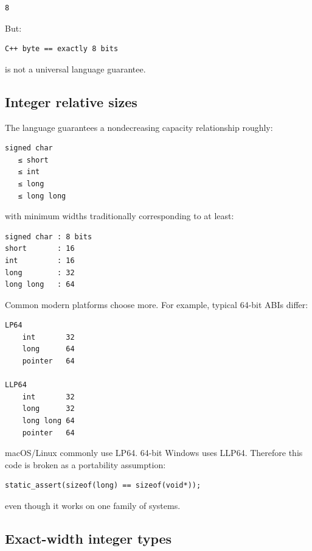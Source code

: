 \begin{verbatim}
8
\end{verbatim}

But:

\begin{verbatim}
C++ byte == exactly 8 bits
\end{verbatim}

is not a universal language guarantee.

\subsection{Integer relative sizes}\label{01-foundations-i-ch002-integer-relative-sizes}

The language guarantees a nondecreasing capacity relationship roughly:

\begin{verbatim}
signed char
   ≤ short
   ≤ int
   ≤ long
   ≤ long long
\end{verbatim}

with minimum widths traditionally corresponding to at least:

\begin{verbatim}
signed char : 8 bits
short       : 16
int         : 16
long        : 32
long long   : 64
\end{verbatim}

Common modern platforms choose more. For example, typical 64-bit ABIs differ:

\begin{verbatim}
LP64
    int       32
    long      64
    pointer   64

LLP64
    int       32
    long      32
    long long 64
    pointer   64
\end{verbatim}

macOS/Linux commonly use LP64. 64-bit Windows uses LLP64. Therefore this code is broken as a portability assumption:

\begin{verbatim}
static_assert(sizeof(long) == sizeof(void*));
\end{verbatim}

even though it works on one family of systems.

\subsection{Exact-width integer types}\label{01-foundations-i-ch002-exact-width-integer-types}

